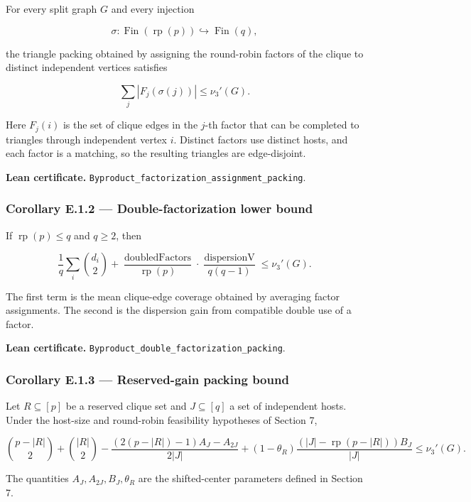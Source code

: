 \documentclass[
  american,
  11pt,
  a4paper,
]{article}
\begin{document}
For every split graph \(G\) and every injection

\[
\sigma:\operatorname{Fin}(\operatorname{rp}(p))\hookrightarrow \operatorname{Fin}(q),
\]

the triangle packing obtained by assigning the round-robin factors of the clique to distinct independent vertices satisfies

\[
\sum_j |F_j(\sigma(j))|\le \nu_3'(G).
\]

Here \(F_j(i)\) is the set of clique edges in the \(j\)-th factor that can be completed to triangles through independent vertex \(i\). Distinct factors use distinct hosts, and each factor is a matching, so the resulting triangles are edge-disjoint.

\textbf{Lean certificate.} \texttt{Byproduct\_factorization\_assignment\_packing}.

\subsubsection{Corollary E.1.2 --- Double-factorization lower bound}\label{corollary-e.1.2-double-factorization-lower-bound}

If \(\operatorname{rp}(p)\le q\) and \(q\ge2\), then

\[
\frac1q\sum_i \binom{d_i}{2}
+
\frac{\operatorname{doubledFactors}}{\operatorname{rp}(p)}
\cdot
\frac{\operatorname{dispersionV}}{q(q-1)}
\le \nu_3'(G).
\]

The first term is the mean clique-edge coverage obtained by averaging factor assignments. The second is the dispersion gain from compatible double use of a factor.

\textbf{Lean certificate.} \texttt{Byproduct\_double\_factorization\_packing}.

\subsubsection{Corollary E.1.3 --- Reserved-gain packing bound}\label{corollary-e.1.3-reserved-gain-packing-bound}

Let \(R\subseteq[p]\) be a reserved clique set and \(J\subseteq[q]\) a set of independent hosts. Under the host-size and round-robin feasibility hypotheses of Section 7,

\[
\binom{p-|R|}{2}+\binom{|R|}{2}
-
\frac{(2(p-|R|)-1)A_J-A_{2J}}{2|J|}
+
(1-\theta_R)\frac{(|J|-\operatorname{rp}(p-|R|))B_J}{|J|}
\le \nu_3'(G).
\]

The quantities \(A_J,A_{2J},B_J,\theta_R\) are the shifted-center parameters defined in Section 7.
\end{document}
